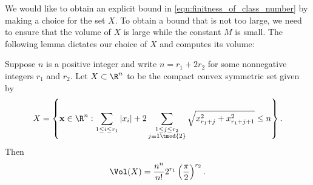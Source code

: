     We would like to obtain an explicit bound in \cref{equ:finitness_of_class_number} by making a choice for the set $X$. To obtain a bound that is not too large, we need to ensure that the volume of $X$ is large while the constant $M$ is small. The following lemma dictates our choice of $X$ and computes its volume:

    \begin{lemma}\label{lem:Minkowski_bound_lemma}
      Suppose $n$ is a positive integer and write $n = r_{1}+2r_{2}$ for some nonnegative integers $r_{1}$ and $r_{2}$. Let $X \subset \R^{n}$ to be the compact convex symmetric set given by
      \[
        X = \left\{\mathbf{x} \in \R^{n}:\sum_{1 \le i \le r_{1}}|x_{i}|+2\sum_{\substack{1 \le j \le r_{2} \\ j \equiv 1 \tmod{2}}}\sqrt{x_{r_{1}+j}^{2}+x_{r_{1}+j+1}^{2}} \le n\right\}.
      \]
      Then
      \[
        \Vol(X) = \frac{n^{n}}{n!}2^{r_{1}}\left(\frac{\pi}{2}\right)^{r_{2}}.
      \]
    \end{lemma}
